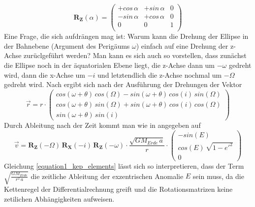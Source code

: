 \begin{equation}
\mathbf{R_Z}(\alpha) = 
	\left(
		\begin{array}{ccc}
			+cos\,\alpha & +sin\,\alpha & 0\\
			-sin\,\alpha & +cos\,\alpha & 0\\
			0 & 0 & 1 \\
		\end{array}
	\right)
\end{equation}
Eine Frage, die sich aufdrängen mag ist: Warum kann die Drehung der Ellipse in der Bahnebene (Argument des Perigäums \ensuremath{\omega}) einfach auf eine Drehung der z-Achse zurüclgeführt werden? Man kann es sich auch so vorstellen, dass zunächst die Ellipse noch in der äquatorialen Ebene liegt, die z-Achse dann um \ensuremath{-\omega} gedreht wird, dann die x-Achse um \ensuremath{-i} und letztendlich die z-Achse nochmal um \ensuremath{-\Omega} gedreht wird.
\newpar
Nach \cite{HandRaum} ergibt sich nach der Ausführung der Drehungen der Vektor
\begin{equation}
\vec{r} = r\cdot  
	\left(
		\begin{array}{c}
				cos(\omega+\theta)\,cos(\Omega)-sin(\omega+\theta)\,cos(i)\,sin(\Omega)\\
				cos(\omega+\theta)\,sin(\Omega)+sin(\omega+\theta)\,cos(i)\,cos(\Omega)\\
				sin(\omega+\theta)\,sin(i)				
		\end{array}
	\right)
	\label{equation1_kep_elements}
\end{equation}
Durch Ableitung nach der Zeit kommt man wie in \cite{HandRaum} angegeben auf
\begin{equation}
	\vec{v}=\mathbf{R_Z}(-\Omega)\,\mathbf{R_X}(-i)\,\mathbf{R_Z}(-\omega)\cdot\frac{\sqrt{GM_{Erde}\,a}}{r}\cdot\left(\begin{array}{c}-sin(E)\\ cos(E)\,\sqrt{1-e'^2} \\0\end{array}\right) 
	\label{equation2_kep_elements}
\end{equation} 
Gleichung \ref{equation1_kep_elements} lässt sich so interpretieren, dass der Term \ensuremath{\sqrt{\frac{GM_{Erde}}{r^2\,a}}} die zeitliche Ableitung der exzentrischen Anomalie \ensuremath{E} sein muss, da die Kettenregel der Differentialrechnung greift und die Rotationsmatrizen keine zetilichen Abhängigkeiten aufweisen.
\newpar
